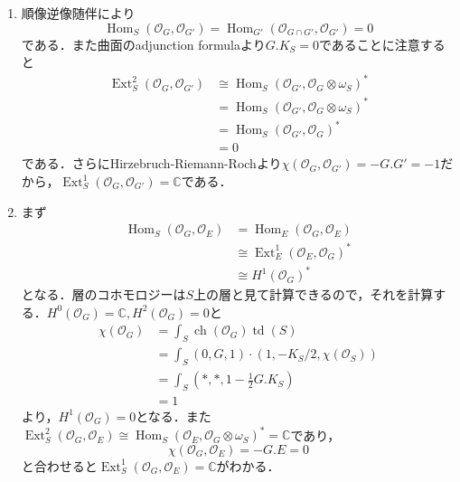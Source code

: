 \documentclass[uplatex,a4paper,11pt,dvipdfmx]{jsarticle}
\makeatletter
\theoremstyle{mystyle} %
\renewenvironment{proof}[1][\proofname]{\par
 \pushQED{\qed}%
 \normalfont \topsep6\p@\@plus6\p@\relax
 \trivlist
 \item[\hskip\labelsep
 \itshape
 {\bf\underline{#1}}]\ignorespaces
}{%
 \popQED\endtrivlist\@endpefalse
}
\DeclareMathOperator{\Hom}{Hom}
\DeclareMathOperator{\Ext}{Ext}
\DeclareMathOperator{\ch}{ch}
\DeclareMathOperator{\td}{td}
\makeatother
\begin{document}
\begin{proof}
	\begin{enumerate}
		\item 順像逆像随伴により$$\Hom_S(\mathcal{O}_G, \mathcal{O}_{G'}) = \Hom_{G'}(\mathcal{O}_{G\cap G'}, \mathcal{O}_{G'}) = 0$$である．また曲面のadjunction formulaより$G.K_S = 0$であることに注意すると
		      \begin{align*}
			      \Ext_S^2(\mathcal{O}_G, \mathcal{O}_{G'}) & \cong \Hom_S(\mathcal{O}_{G'}, \mathcal{O}_G \otimes \omega_S)^* \\
			                                                & =\Hom_S(\mathcal{O}_{G'}, \mathcal{O}_G \otimes \omega_S)^*      \\
			                                                & =\Hom_S(\mathcal{O}_{G'}, \mathcal{O}_G)^*                       \\
			                                                & =0
		      \end{align*}
		      である．さらにHirzebruch-Riemann-Rochより$\chi(\mathcal{O}_G, \mathcal{O}_{G'}) = -G.G' = -1$だから，$\Ext_S^1(\mathcal{O}_G, \mathcal{O}_{G'}) = \mathbb{C}$である．
		\item まず\begin{align*}
			      \Hom_S(\mathcal{O}_G, \mathcal{O}_E) & =\Hom_E(\mathcal{O}_G, \mathcal{O}_E)          \\
			                                           & \cong \Ext^1_E(\mathcal{O}_E, \mathcal{O}_G)^* \\
			                                           & \cong H^1(\mathcal{O}_G)^*
		      \end{align*}
		      となる．層のコホモロジーは$S$上の層と見て計算できるので，それを計算する．$H^0(\mathcal{O}_G)=\mathbb{C}, H^2(\mathcal{O}_G)=0$と
		      \begin{align*}
			      \chi(\mathcal{O}_G) & = \int_S\ch(\mathcal{O}_G)\td(S)                      \\
			                          & =\int_S(0, G, 1)\cdot(1, -K_S/2, \chi(\mathcal{O}_S)) \\
			                          & =\int_S(*, *, 1-\frac{1}{2}G.K_S)                     \\
			                          & =1
		      \end{align*}
		      より，$H^1(\mathcal{O}_G) = 0$となる．また$\Ext^2_S(\mathcal{O}_G, \mathcal{O}_E)\cong\Hom_S(\mathcal{O}_E, \mathcal{O}_G\otimes \omega_S)^* =\mathbb{C}$であり，
		      $$\chi(\mathcal{O}_G, \mathcal{O}_E) = -G.E = 0$$と合わせると$\Ext^1_S(\mathcal{O}_G, \mathcal{O}_E) = \mathbb{C}$がわかる．

\end{enumerate}
\end{proof}
\end{document}
